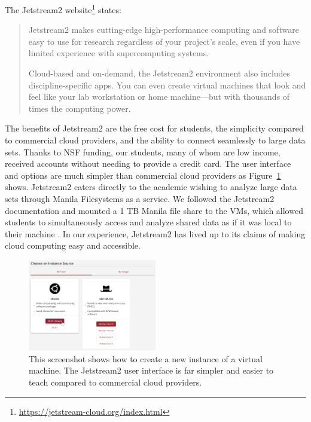 \documentclass[12pt]{article}
\begin{document}
The Jetstream2 website\footnote{\url{https://jetstream-cloud.org/index.html}} states:
\begin{quote}
Jetstream2 makes cutting-edge high-performance computing and software easy to use for research regardless of your project’s scale, even if you have limited experience with supercomputing systems.

Cloud-based and on-demand, the Jetstream2 environment also includes discipline-specific apps. You can even create virtual machines that look and feel like your lab workstation or home machine—but with thousands of times the computing power.
\end{quote}

The benefits of Jetstream2 are the free cost for students, the simplicity compared to commercial cloud providers, and the ability to connect seamlessly to large data sets.
Thanks to NSF funding, our students, many of whom are low income, received accounts without needing to provide a credit card.
The user interface and options are much simpler than commercial cloud providers as Figure~\ref{fig:jetstream} shows. 
Jetstream2 caters directly to the academic wishing to analyze large data sets through Manila Filesystems as a service.
We followed the Jetstream2 documentation and mounted a 1 TB Manila file share to the VMs, which allowed students to simultaneously access and analyze shared data as if it was local to their machine \cite{manila}.
In our experience, Jetstream2 has lived up to its claims of making cloud computing easy and accessible.

\begin{figure}[h]
    \centering
    \includegraphics[width=0.5\textwidth]{jetstream}
    \caption{This screenshot shows how to create a new instance of a virtual machine.
The Jetstream2 user interface is far simpler and easier to teach compared to commercial cloud providers.}
    \label{fig:jetstream}
\end{figure}
\end{document}
